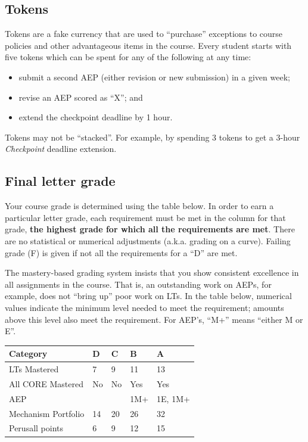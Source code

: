 \hypertarget{tokens}{%
\subsection{Tokens}\label{tokens}}

Tokens are a fake currency that are used to ``purchase'' exceptions to
course policies and other advantageous items in the course. Every
student starts with five tokens which can be spent for any of the
following at any time:

\begin{itemize}
\tightlist
\item
  submit a second AEP (either revision or new submission) in a given
  week;
\item
  revise an AEP scored as ``X''; and
\item
  extend the checkpoint deadline by 1 hour.
\end{itemize}

Tokens may not be ``stacked''. For example, by spending 3 tokens to get
a 3-hour \emph{Checkpoint} deadline extension.

\hypertarget{final-letter-grade}{%
\subsection{Final letter grade}\label{final-letter-grade}}

Your course grade is determined using the table below. In order to earn
a particular letter grade, each requirement must be met in the column
for that grade, \textbf{the highest grade for which all the requirements
are met}. There are no statistical or numerical adjustments (a.k.a.
grading on a curve). Failing grade (F) is given if not all the
requirements for a ``D'' are met.

The mastery-based grading system insists that you show consistent
excellence in all assignments in the course. That is, an outstanding
work on AEPs, for example, does not ``bring up'' poor work on LTs. In
the table below, numerical values indicate the minimum level needed to
meet the requirement; amounts above this level also meet the
requirement. For AEP's, ``M+'' means ``either M or E''.

\begin{longtable}[]{@{}lllll@{}}
\toprule
Category & D & C & B & A \\
\midrule
\endhead
LTs Mastered & 7 & 9 & 11 & 13 \\
All CORE Mastered & No & No & Yes & Yes \\
AEP & & & 1M+ & 1E, 1M+ \\
Mechanism Portfolio & 14 & 20 & 26 & 32 \\
Perusall points & 6 & 9 & 12 & 15 \\
\bottomrule
\end{longtable}

